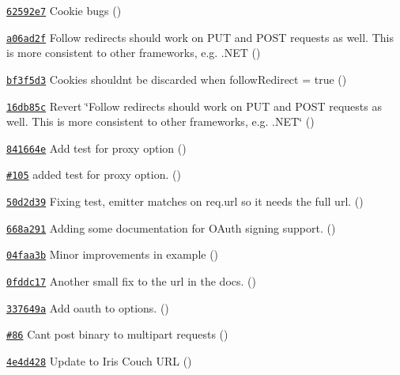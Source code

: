 \begin{DoxyItemize}
\item \href{https://github.com/mikeal/request/commit/62592e7fe9ee5ecaee80b8f5bc2400e4a277e694}{\tt 62592e7} Cookie bugs ()
\item \href{https://github.com/mikeal/request/commit/a06ad2f955270974409e75c088e1f5d1f5298ff5}{\tt a06ad2f} Follow redirects should work on P\+U\+T and P\+O\+S\+T requests as well. This is more consistent to other frameworks, e.\+g. .N\+E\+T ()
\item \href{https://github.com/mikeal/request/commit/bf3f5d30fdabf6946096623fc3398bb66ed19a1f}{\tt bf3f5d3} Cookies shouldn\textquotesingle{}t be discarded when follow\+Redirect = true ()
\item \href{https://github.com/mikeal/request/commit/16db85c07e6c2516269299640fdddca6db7bc051}{\tt 16db85c} Revert \char`\"{}\+Follow redirects should work on P\+U\+T and P\+O\+S\+T requests as well. This is more consistent to other frameworks, e.\+g. .\+N\+E\+T\char`\"{} ()
\item \href{https://github.com/mikeal/request/commit/841664e309f329be98c1a011c634f5291af1eebc}{\tt 841664e} Add test for proxy option ()
\item \href{https://github.com/mikeal/request/pull/105}{\tt \#105} added test for proxy option. ()
\item \href{https://github.com/mikeal/request/commit/50d2d3934cd86d7142a4aab66017bb1ef82329cf}{\tt 50d2d39} Fixing test, emitter matches on req.\+url so it needs the full url. ()
\item \href{https://github.com/mikeal/request/commit/668a291013380af305eba12b1d5c7a5376a74c76}{\tt 668a291} Adding some documentation for O\+Auth signing support. ()
\item \href{https://github.com/mikeal/request/commit/04faa3bf2b1f4ec710414c6ec7231b24767b2f89}{\tt 04faa3b} Minor improvements in example ()
\item \href{https://github.com/mikeal/request/commit/0fddc1798dcd9b213e3f8aec504c61cecf4d7997}{\tt 0fddc17} Another small fix to the url in the docs. ()
\item \href{https://github.com/mikeal/request/commit/337649a08b4263c0d108cd4621475c8ff9cf8dd0}{\tt 337649a} Add oauth to options. ()
\item \href{https://github.com/mikeal/request/pull/86}{\tt \#86} Can\textquotesingle{}t post binary to multipart requests ()
\item \href{https://github.com/mikeal/request/commit/4e4d4285490be20abf89ff1fb54fb5088c01c00e}{\tt 4e4d428} Update to Iris Couch U\+R\+L ()

\end{DoxyItemize}
